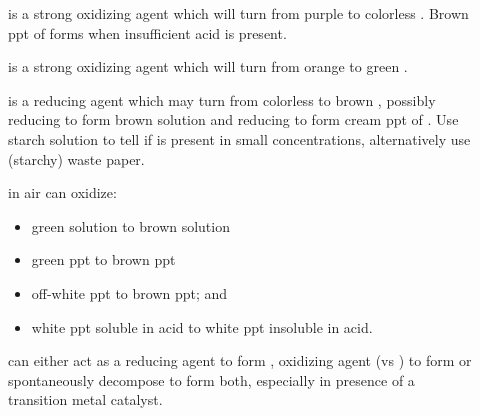 \documentclass[../main]{subfiles}
\begin{document}
		\begin{description}
		\item[] is a strong oxidizing agent which will turn from purple to colorless . Brown ppt of  forms when insufficient acid is present.
		\item[] is a strong oxidizing agent which will turn from orange to green .
		\item[] is a reducing agent which may turn from colorless to brown , possibly reducing  to form brown solution and reducing  to form cream ppt of . Use starch solution to tell if  is present in small concentrations, alternatively use (starchy) waste paper.
		\item[] in air can oxidize:
		\begin{itemize}
			\item green  solution to brown  solution
			\item green  ppt to brown  ppt
			\item off-white  ppt to brown  ppt; and
			\item white  ppt soluble in acid to white  ppt insoluble in acid.
		\end{itemize}
		\item[] can either act as a reducing agent to form , oxidizing agent (vs ) to form  or spontaneously decompose to form both, especially in presence of a transition metal catalyst.
		\end{description}
\end{document}
